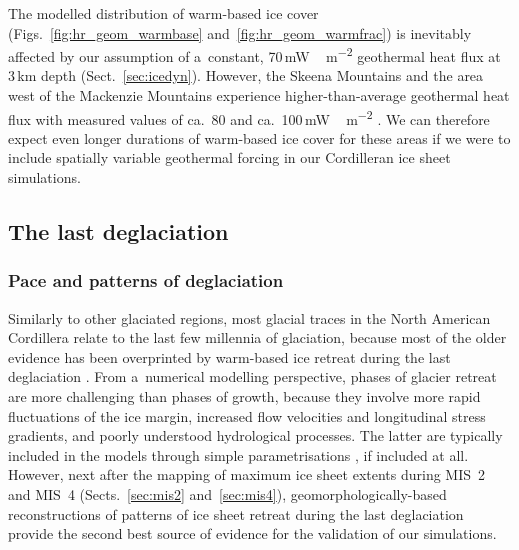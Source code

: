 \documentclass[tc, manuscript]{copernicus}
\begin{document}
      The modelled distribution of warm-based ice cover
      (Figs.~\ref{fig:hr_geom_warmbase} and~\ref{fig:hr_geom_warmfrac}) is
      inevitably affected by our assumption of a~constant,
      70\,\unit{mW\,m^{-2}} geothermal heat flux at 3\,\unit{km} depth
      (Sect.~\ref{sec:icedyn}). However, the Skeena Mountains and the area
      west of the Mackenzie Mountains experience higher-than-average
      geothermal heat flux with measured values of ca.~80 and
      ca.~100\,\unit{mW\,m^{-2}} \citep{Blackwell.Richards.2004}. We can
      therefore expect even longer durations of warm-based ice cover for
      these areas if we were to include spatially variable geothermal
      forcing in our Cordilleran ice sheet simulations.


\subsection{The last deglaciation}

\subsubsection{Pace and patterns of deglaciation}

      Similarly to other glaciated regions, most glacial traces in the North
      American Cordillera relate to the last few millennia of glaciation,
      because most of the older evidence has been overprinted by warm-based
      ice retreat during the last deglaciation \citep{Kleman.1994,
      Kleman.etal.2010}. From a~numerical modelling perspective, phases of
      glacier retreat are more challenging than phases of growth, because
      they involve more rapid fluctuations of the ice margin, increased flow
      velocities and longitudinal stress gradients, and poorly understood
      hydrological processes. The latter are typically included in the
      models through simple parametrisations
      \citep[e.g.][]{Clason.etal.2012, Clason.etal.2014, Bueler.Pelt.2015},
      if included at all. However, next after the mapping of maximum ice
      sheet extents during MIS~2 and MIS~4 (Sects.~\ref{sec:mis2}
      and~\ref{sec:mis4}), geomorphologically-based reconstructions of
      patterns of ice sheet retreat during the last deglaciation provide the
      second best source of evidence for the validation of our simulations.
\end{document}
